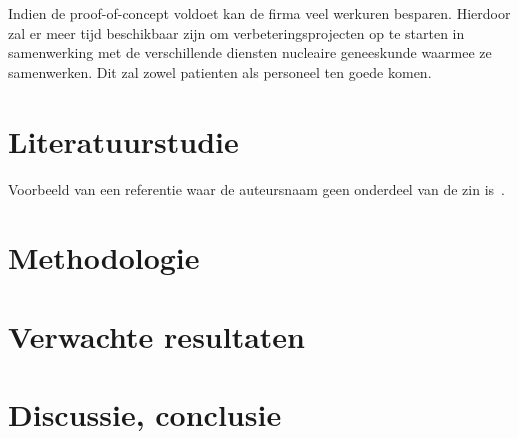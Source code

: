 \documentclass{hogent-article}
\begin{document}
Indien de proof-of-concept voldoet kan de firma veel werkuren besparen. Hierdoor zal er meer tijd beschikbaar zijn om verbeteringsprojecten op te starten in samenwerking met de verschillende diensten nucleaire geneeskunde waarmee ze samenwerken. Dit zal zowel patienten als personeel ten goede komen.


\section{Literatuurstudie}%
\label{sec:literatuurstudie}


Voorbeeld van een referentie waar de auteursnaam geen onderdeel van de zin is~\autocite{Moore2002}.

\lipsum[4-9]

\section{Methodologie}%
\label{sec:methodologie}


\lipsum[10-12]

\section{Verwachte resultaten}%
\label{sec:verwachte-resultaten}


\lipsum[14-18]

\section{Discussie, conclusie}%
\label{sec:discussie-conclusie}

\lipsum[19-21]


\printbibliography[heading=bibintoc]
\end{document}
